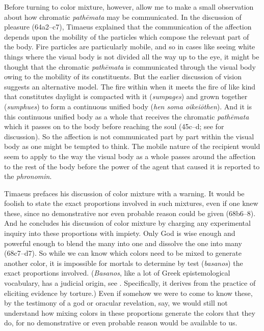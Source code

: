 Before turning to color mixture, however, allow me to make a small observation about how chromatic \emph{pathēmata} may be communicated. In the discussion of pleasure (64a2--c7), Timaeus explained that the communication of the affection depends upon the mobility of the particles which compose the relevant part of the body. Fire particles are particularly mobile, and so in cases like seeing white things where the visual body is not divided all the way up to the eye, it might be thought that the chromatic \emph{pathēmata} is communicated through the visual body owing to the mobility of its constituents. But the earlier discussion of vision suggests an alternative model. The fire within when it meets the fire of like kind that constitutes daylight is compacted with it (\emph{sumpages}) and grown together (\emph{sumphues}) to form a continuous unified body (\emph{hen soma oikeiōthen}). And it is this continuous unified body as a whole that receives the chromatic \emph{pathēmata} which it passes on to the body before reaching the soul (45c--d; see \citealt[72, 92 n46]{Hahm:1978ny} for discussion). So the affection is not communicated part by part within the visual body as one might be tempted to think. The mobile nature of the recipient would seem to apply to the way the visual body as a whole passes around the affection to the rest of the body before the power of the agent that caused it is reported to the \emph{phronomin}.

Timaeus prefaces his discussion of color mixture with a warning. It would be foolish to state the exact proportions involved in such mixtures, even if one knew these, since no demonstrative nor even probable reason could be given (68b6--8). And he concludes his discussion of color mixture by charging any experimental inquiry into these proportions with impiety. Only God is wise enough and powerful enough to blend the many into one and dissolve the one into many (68c7--d7). So while we can know which colors need to be mixed to generate another color, it is impossible for mortals to determine by test (\emph{basanos}) the exact proportions involved. (\emph{Basanos}, like a lot of Greek epistemological vocabulary, has a judicial origin, see \citealt[chapter 4]{Lloyd:1979lc}. Specifically, it derives from the practice of eliciting evidence by torture.) Even if somehow we were to come to know these, by the testimony of a god or oracular revelation, say, we would still not understand how mixing colors in these proportions generate the colors that they do, for no demonstrative or even probable reason would be available to us.

